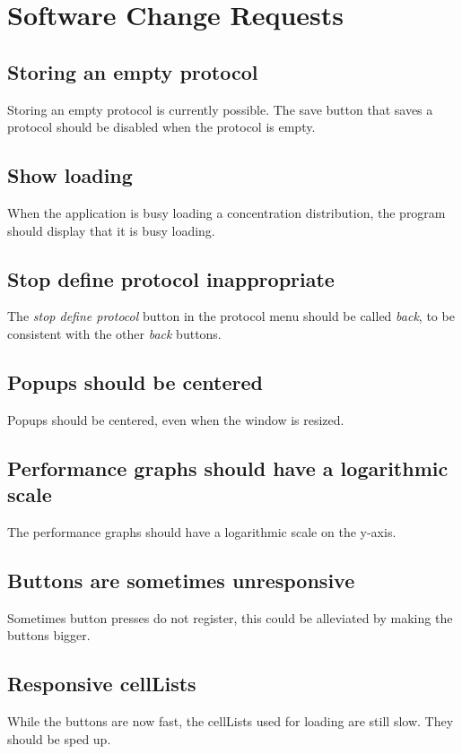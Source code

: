 \chapter{Software Change Requests}
\label{chap:changes}

\section*{Storing an empty protocol}
Storing an empty protocol is currently possible. The save button that saves a protocol should be disabled when the protocol is empty.

\section*{Show loading}
When the application is busy loading a concentration distribution, the program should display that it is busy loading.

\section*{Stop define protocol inappropriate}
The \emph{stop define protocol} button in the protocol menu should be called \emph{back}, to be consistent with the other \emph{back} buttons.

\section*{Popups should be centered}
Popups should be centered, even when the window is resized.

\section*{Performance graphs should have a logarithmic scale}
The performance graphs should have a logarithmic scale on the y-axis.

\section*{Buttons are sometimes unresponsive}
Sometimes button presses do not register, this could be alleviated by making the buttons bigger.

\section*{Responsive cellLists}
While the buttons are now fast, the cellLists used for loading are still slow. They should be sped up.

